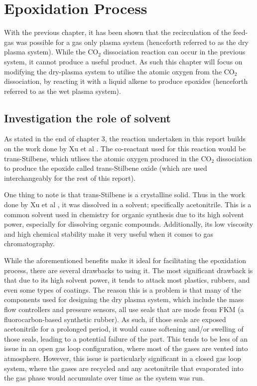 \chapter{Epoxidation Process}

With the previous chapter, it has been shown that the recirculation of the feed-gas was possible for a gas only plasma system (henceforth referred to as the dry plasma system). While the CO$_2$ dissociation reaction can occur in the previous system,  it cannot produce a useful product. As such this chapter will focus on modifying the dry-plasma system to utilise the atomic oxygen from the CO$_2$ dissociation, by reacting it with a liquid alkene to produce epoxides (henceforth referred to as the wet plasma system). 

\section{Investigation the role of solvent}

As stated in the end of chapter 3, the reaction undertaken in this report builds on the work done by Xu et al \cite{Xu2021}. The co-reactant used for this reaction would be trans-Stilbene, which utlises the atomic oxygen produced in the CO$_2$ dissociation to produce the epoxide called trans-Stilbene oxide (which are used interchangeably for the rest of this report). 

One thing to note is that trans-Stilbene is a crystalline solid. Thus in the work done by Xu et al \cite{Xu2021}, it was dissolved in a solvent; specifically acetonitrile. This is a common solvent used in chemistry for organic synthesis due to its high solvent power, especially for dissolving organic compounds. Additionally, its low viscosity and high chemical stability make it very useful when it comes to gas chromatography. 

While the aforementioned benefits make it ideal for facilitating the epoxidation process, there are several drawbacks to using it. The most significant drawback is that due to its high solvent power, it tends to attack most plastics, rubbers, and even some types of coatings. The reason this is a problem is that many of the components used for designing the dry plasma system, which include the mass flow controllers and pressure sensors, all use seals that are mode from FKM (a fluorocarbon-based synthetic rubber). As such, if those seals are exposed acetonitrile for a prolonged period, it would cause softening and/or swelling of those seals, leading to a potential failure of the part. This tends to be less of an issue in an open gas loop configuration, where most of the gases are vented into atmosphere. However, this issue is particularly significant in a closed gas loop system, where the gases are recycled and any acetonitrile that evaporated into the gas phase would accumulate over time as the system was run.

